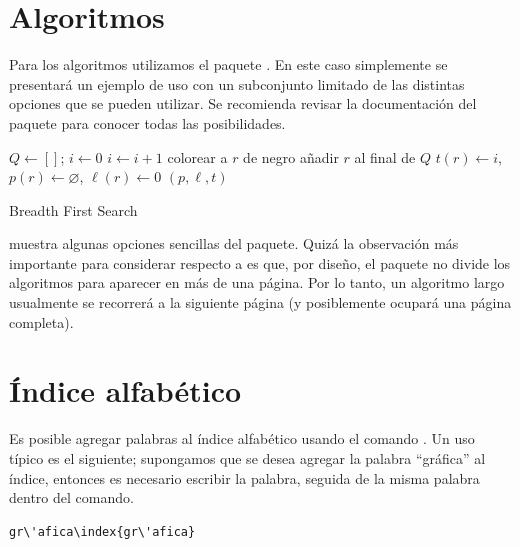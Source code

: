 \section{Algoritmos}

Para los algoritmos utilizamos el paquete \href{https://www.ctan.org/pkg/%
algorithm2e}{}.   En este caso simplemente
se presentar\'a un ejemplo de uso con un subconjunto limitado de las distintas
opciones que se pueden utilizar.   Se recomienda revisar la documentaci\'on del
paquete para conocer todas las posibilidades.

\begin{algorithm}[ht!]
  \DontPrintSemicolon

  \BlankLine
  $Q \leftarrow []$; $i \leftarrow 0$\;
  $i \leftarrow i+1$\;
  colorear a $r$ de negro\;
  a\~nadir $r$ al final de $Q$\;
  $t(r) \leftarrow i$, $p(r) \leftarrow \varnothing$, $\ell (r) \leftarrow 0$\;
  {
  }
  {\Return $(p,\ell,t)$}
  \caption{Breadth First Search}
  \label{alg:bfs}
\DecMargin{1em}
\end{algorithm}

 muestra algunas opciones sencillas del paquete.   Quiz\'a la
observaci\'on m\'as importante para considerar respecto a  es
que, por dise\~no, el paquete no divide los algoritmos para aparecer en m\'as
de una p\'agina.   Por lo tanto, un algoritmo largo usualmente se recorrer\'a
a la siguiente p\'agina (y posiblemente ocupar\'a una p\'agina completa).

\section{\'Indice alfab\'etico}
\label{sec:indice}

Es posible agregar palabras al \'indice alfab\'etico
usando el comando .   Un uso t\'ipico es el
siguiente; supongamos que se desea agregar la palabra ``gr\'afica'' al \'indice,
entonces es necesario escribir la palabra, seguida de la misma palabra dentro
del comando.
\begin{lstlisting}
gr\'afica\index{gr\'afica}
\end{lstlisting}

